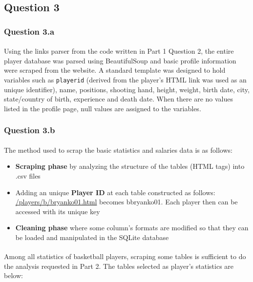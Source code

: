 
\subsection{Question 3}
\label{subsec:313}

\subsubsection{Question 3.a}
\label{subsubsec:313a}
\paragraph{}Using the links parser from the code written in Part 1 Question 2, the entire player database was parsed using BeautifulSoup and basic profile information were scraped from the website. A standard template was designed to hold variables such as \verb|playerid| (derived from the player’s HTML link was used as an unique identifier), name, positions, shooting hand, height, weight, birth date, city, state/country of birth, experience and death date. When there are no values listed in the profile page, null values are assigned to the variables.

\subsubsection{Question 3.b}
\label{subsubsec:313b}

\paragraph{}The method used to scrap the basic statistics and salaries data is as follows:

\begin{itemize}
	\item \textbf{Scraping phase} by analyzing the structure of the tables (HTML tags) into .csv files
	\item Adding an unique \textbf{Player ID} at each table constructed as follows: \url{/players/b/bryanko01.html} becomes bbryanko01. Each player then can be accessed with its unique key
	\item \textbf{Cleaning phase} where some column's formats are modified so that they can be loaded and manipulated in the SQLite database
\end{itemize}

\paragraph{}Among all statistics of basketball players, scraping some tables is sufficient to do the analysis requested in Part 2. The tables selected as player's statistics are below:

